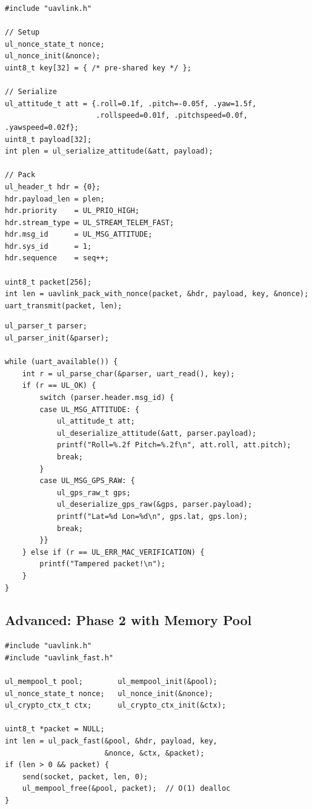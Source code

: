\documentclass[11pt,a4paper]{article}
\begin{document}
\begin{lstlisting}[caption={Sending an attitude message over UART}]
#include "uavlink.h"

// Setup
ul_nonce_state_t nonce;
ul_nonce_init(&nonce);
uint8_t key[32] = { /* pre-shared key */ };

// Serialize
ul_attitude_t att = {.roll=0.1f, .pitch=-0.05f, .yaw=1.5f,
                     .rollspeed=0.01f, .pitchspeed=0.0f, .yawspeed=0.02f};
uint8_t payload[32];
int plen = ul_serialize_attitude(&att, payload);

// Pack
ul_header_t hdr = {0};
hdr.payload_len = plen;
hdr.priority    = UL_PRIO_HIGH;
hdr.stream_type = UL_STREAM_TELEM_FAST;
hdr.msg_id      = UL_MSG_ATTITUDE;
hdr.sys_id      = 1;
hdr.sequence    = seq++;

uint8_t packet[256];
int len = uavlink_pack_with_nonce(packet, &hdr, payload, key, &nonce);
uart_transmit(packet, len);
\end{lstlisting}

\begin{lstlisting}[caption={Receiving messages from a byte stream}]
ul_parser_t parser;
ul_parser_init(&parser);

while (uart_available()) {
    int r = ul_parse_char(&parser, uart_read(), key);
    if (r == UL_OK) {
        switch (parser.header.msg_id) {
        case UL_MSG_ATTITUDE: {
            ul_attitude_t att;
            ul_deserialize_attitude(&att, parser.payload);
            printf("Roll=%.2f Pitch=%.2f\n", att.roll, att.pitch);
            break;
        }
        case UL_MSG_GPS_RAW: {
            ul_gps_raw_t gps;
            ul_deserialize_gps_raw(&gps, parser.payload);
            printf("Lat=%d Lon=%d\n", gps.lat, gps.lon);
            break;
        }}
    } else if (r == UL_ERR_MAC_VERIFICATION) {
        printf("Tampered packet!\n");
    }
}
\end{lstlisting}

\subsection{Advanced: Phase 2 with Memory Pool}

\begin{lstlisting}[caption={Using Phase 2 fast API with memory pool}]
#include "uavlink.h"
#include "uavlink_fast.h"

ul_mempool_t pool;        ul_mempool_init(&pool);
ul_nonce_state_t nonce;   ul_nonce_init(&nonce);
ul_crypto_ctx_t ctx;      ul_crypto_ctx_init(&ctx);

uint8_t *packet = NULL;
int len = ul_pack_fast(&pool, &hdr, payload, key,
                       &nonce, &ctx, &packet);
if (len > 0 && packet) {
    send(socket, packet, len, 0);
    ul_mempool_free(&pool, packet);  // O(1) dealloc
}
\end{lstlisting}
\end{document}
